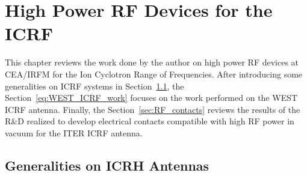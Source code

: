 \setchapterpreamble[u]{\margintoc}
\chapter[High Power RF Devices for the Ion Cyclotron Range of Frequencie]{High Power RF Devices for the ICRF}
\label{chap:ICRF}




This chapter reviews the work done by the author on high power RF devices at CEA/IRFM for the Ion Cyclotron Range of Frequencies. After introducing some generalities on ICRF systems in Section~\ref{sec:ICRH_antennas_general}, the Section~\ref{eq:WEST_ICRF_work} focuses on the work performed on the WEST ICRF antenna. Finally, the Section~\ref{sec:RF_contacts} reviews the results of the R\&D realized to develop electrical contacts compatible with high RF power in vacuum for the ITER ICRF antenna. 


\section[Generalities]{Generalities on ICRH Antennas}\label{sec:ICRH_antennas_general}

